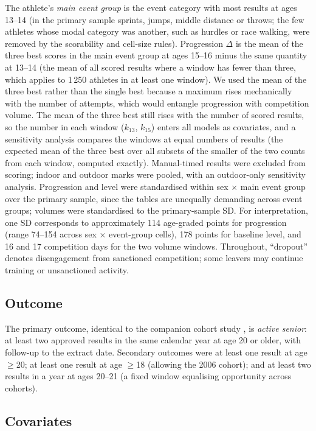 \documentclass[12pt,a4paper]{article}
\begin{document}
The athlete's \emph{main event group} is the event category with most results at ages 13--14 (in the primary sample sprints, jumps, middle distance or throws; the few athletes whose modal category was another, such as hurdles or race walking, were removed by the scorability and cell-size rules). Progression $\Delta$ is the mean of the three best scores in the main event group at ages 15--16 minus the same quantity at 13--14 (the mean of all scored results where a window has fewer than three, which applies to 1\,250 athletes in at least one window). We used the mean of the three best rather than the single best because a maximum rises mechanically with the number of attempts, which would entangle progression with competition volume. The mean of the three best still rises with the number of scored results, so the number in each window ($k_{13}$, $k_{15}$) enters all models as covariates, and a sensitivity analysis compares the windows at equal numbers of results (the expected mean of the three best over all subsets of the smaller of the two counts from each window, computed exactly). Manual-timed results were excluded from scoring; indoor and outdoor marks were pooled, with an outdoor-only sensitivity analysis. Progression and level were standardised within sex $\times$ main event group over the primary sample, since the tables are unequally demanding across event groups; volumes were standardised to the primary-sample SD. For interpretation, one SD corresponds to approximately 114 age-graded points for progression (range 74--154 across sex $\times$ event-group cells), 178 points for baseline level, and 16 and 17 competition days for the two volume windows. Throughout, ``dropout'' denotes disengagement from sanctioned competition; some leavers may continue training or unsanctioned activity.

\subsection{Outcome}

The primary outcome, identical to the companion cohort study \cite{guttormsen2026dropout}, is \emph{active senior}: at least two approved results in the same calendar year at age 20 or older, with follow-up to the extract date. Secondary outcomes were at least one result at age $\geq$20; at least one result at age $\geq$18 (allowing the 2006 cohort); and at least two results in a year at ages 20--21 (a fixed window equalising opportunity across cohorts).

\subsection{Covariates}
\end{document}
